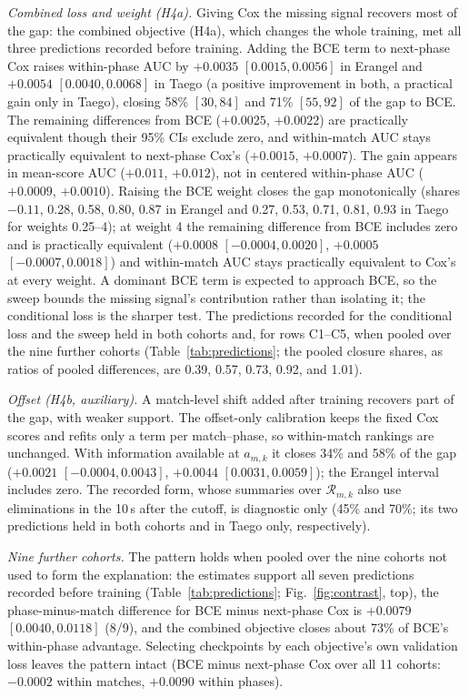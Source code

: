 \documentclass[sigconf,anonymous]{acmart}
\begin{document}
\emph{Combined loss and weight (H4a).} Giving Cox the missing signal recovers most of the gap: the combined objective (H4a), which changes the whole training, met all three predictions recorded before training. Adding the BCE term to next-phase Cox raises within-phase AUC by $+0.0035$ $[0.0015,\allowbreak 0.0056]$ in Erangel and $+0.0054$ $[0.0040,\allowbreak 0.0068]$ in Taego (a positive improvement in both, a practical gain only in Taego), closing 58\% $[30,\allowbreak 84]$ and 71\% $[55,\allowbreak 92]$ of the gap to BCE. The remaining differences from BCE ($+0.0025$, $+0.0022$) are practically equivalent though their 95\% CIs exclude zero, and within-match AUC stays practically equivalent to next-phase Cox's ($+0.0015$, $+0.0007$). The gain appears in mean-score AUC ($+0.011$, $+0.012$), not in centered within-phase AUC ($+0.0009$, $+0.0010$). Raising the BCE weight closes the gap monotonically (shares $-0.11$, 0.28, 0.58, 0.80, 0.87 in Erangel and 0.27, 0.53, 0.71, 0.81, 0.93 in Taego for weights 0.25--4); at weight 4 the remaining difference from BCE includes zero and is practically equivalent ($+0.0008$ $[-0.0004,\allowbreak 0.0020]$, $+0.0005$ $[-0.0007,\allowbreak 0.0018]$) and within-match AUC stays practically equivalent to Cox's at every weight. A dominant BCE term is expected to approach BCE, so the sweep bounds the missing signal's contribution rather than isolating it; the conditional loss is the sharper test. The predictions recorded for the conditional loss and the sweep held in both cohorts and, for rows C1--C5, when pooled over the nine further cohorts (Table~\ref{tab:predictions}; the pooled closure shares, as ratios of pooled differences, are 0.39, 0.57, 0.73, 0.92, and 1.01).

\emph{Offset (H4b, auxiliary).} A match-level shift added after training recovers part of the gap, with weaker support. The offset-only calibration keeps the fixed Cox scores and refits only a term per match--phase, so within-match rankings are unchanged. With information available at $a_{m,k}$ it closes 34\% and 58\% of the gap ($+0.0021$ $[-0.0004,\allowbreak 0.0043]$, $+0.0044$ $[0.0031,\allowbreak 0.0059]$); the Erangel interval includes zero. The recorded form, whose summaries over $\mathcal{R}_{m,k}$ also use eliminations in the 10\,s after the cutoff, is diagnostic only (45\% and 70\%; its two predictions held in both cohorts and in Taego only, respectively).


\emph{Nine further cohorts.} The pattern holds when pooled over the nine cohorts not used to form the explanation: the estimates support all seven predictions recorded before training (Table~\ref{tab:predictions}; Fig.~\ref{fig:contrast}, top), the phase-minus-match difference for BCE minus next-phase Cox is $+0.0079$ $[0.0040,\allowbreak 0.0118]$ (8/9), and the combined objective closes about 73\% of BCE's within-phase advantage. Selecting checkpoints by each objective's own validation loss leaves the pattern intact (BCE minus next-phase Cox over all 11 cohorts: $-0.0002$ within matches, $+0.0090$ within phases).
\end{document}
